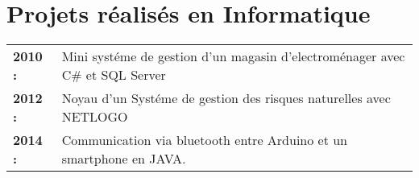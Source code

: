 \documentclass[a4paper,10pt]{article}
\begin{document}
\hfill
\begin{minipage}[t]{0.55\textwidth}

\section{\LARGE{Projets r\'ealis\'es en Informatique}}
\begin{tabularx}{300pt}{>{\raggedleft\scshape}p{29mm}X}
\textbf{2010 :} & Mini syst\'eme de gestion d'un magasin d'electrom\'enager avec C\# et SQL Server\\ 
\textbf{2012 :} & Noyau d'un Syst\'eme de gestion des risques naturelles avec NETLOGO\\
\textbf{2014 :} & Communication via bluetooth entre Arduino et un smartphone en JAVA.\\
\end{tabularx}


\end{minipage} %

\end{document}
